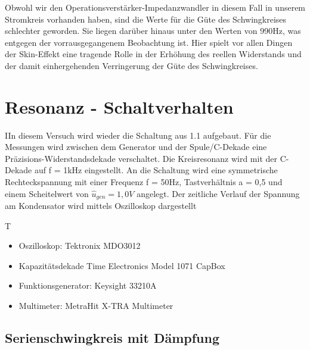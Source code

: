 \documentclass{article}
\begin{document}
Obwohl wir den Operationsverstärker-Impedanzwandler in diesem Fall in unserem Stromkreis vorhanden haben, sind die Werte für die Güte des Schwingkreises schlechter geworden. Sie liegen darüber hinaus
unter den Werten von 990Hz, was entgegen der vorrausgegangenem Beobachtung ist. Hier spielt vor allen Dingen der Skin-Effekt eine tragende Rolle in der Erhöhung des reellen Widerstands und der damit einhergehenden Verringerung
der Güte des Schwingkreises.

\newpage
\section{Resonanz - Schaltverhalten}
\begin{task}
  IIn diesem Versuch wird wieder die Schaltung aus 1.1 aufgebaut. Für die Messungen wird zwischen dem Generator und der Spule/C-Dekade eine Präzisions-Widerstandsdekade verschaltet.
  Die Kreisresonanz wird mit der C-Dekade auf f = 1kHz eingestellt. An die Schaltung wird eine symmetrische Rechteckspannung mit einer Frequenz f = 50Hz, Tastverhältnis a = 0,5 und einem Scheitelwert von $\hat{u}_{gen} = 1,0 V$ angelegt.
  Der zeitliche Verlauf der Spannung am Kondensator wird mittels Oszilloskop dargestellt
\end{task}

\begin{devlist}
  T
  \begin{itemize}
    \item Oszilloskop: Tektronix MDO3012
    \item Kapazitätsdekade Time Electronics Model 1071 CapBox
    \item Funktionsgenerator: Keysight 33210A
    \item Multimeter: MetraHit X-TRA Multimeter
  \end{itemize}
\end{devlist}

\subsection{Serienschwingkreis mit Dämpfung}
\end{document}
